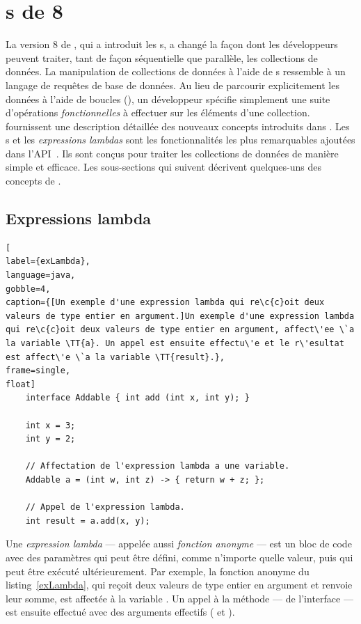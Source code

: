 \section{s de  8}
\label{java8.sect}

La version 8 de , qui a introduit les s, a chang\'e la façon dont les d\'eveloppeurs peuvent traiter, tant de fa\c{c}on s\'equentielle que parall\`ele, les collections de donn\'ees. La manipulation de collections de donn\'ees \`a l'aide de s ressemble \`a un langage de requ\^etes de base de donn\'ees. Au lieu de parcourir explicitement les donn\'ees \`a l'aide de boucles (), un d\'eveloppeur sp\'ecifie simplement une suite d'op\'erations \emph{fonctionnelles} \`a effectuer sur les \'el\'ements d'une collection. \cite{urma2014java} fournissent une description d\'etaill\'ee des nouveaux concepts introduits dans . Les s et les \emph{expressions lambdas} sont les fonctionnalit\'es les plus remarquables ajout\'ees dans l'API~\citep{javaStreamAPI}. Ils sont con\c{c}us pour traiter les collections de donn\'ees de mani\`ere simple et efficace. Les sous-sections qui suivent d\'ecrivent quelques-uns des concepts de .


\subsection{Expressions lambda}



\begin{lstlisting}[
label={exLambda},
language=java,
gobble=4,
caption={[Un exemple d'une expression lambda qui re\c{c}oit deux valeurs de type entier en argument.]Un exemple d'une expression lambda qui re\c{c}oit deux valeurs de type entier en argument, affect\'ee \`a la variable \TT{a}. Un appel est ensuite effectu\'e et le r\'esultat est affect\'e \`a la variable \TT{result}.},
frame=single,
float]
    interface Addable { int add (int x, int y); }
    
    int x = 3;
    int y = 2;
    
    // Affectation de l'expression lambda a une variable.
    Addable a = (int w, int z) -> { return w + z; };

    // Appel de l'expression lambda.
    int result = a.add(x, y);    
\end{lstlisting}



Une \emph{expression lambda} ---  appel\'ee aussi \emph{fonction anonyme} --- est un bloc de code avec des param\`etres qui peut \^etre d\'efini, comme n'importe quelle valeur, puis qui peut \^etre ex\'ecut\'e ult\'erieurement. Par exemple, la fonction anonyme du listing~\ref{exLambda}, qui re\c{c}oit deux valeurs de type entier en argument et renvoie leur somme, est affect\'ee \`a la variable . Un appel \`a la m\'ethode  --- de l'interface  --- est ensuite effectu\'e avec des arguments effectifs ( et ).


